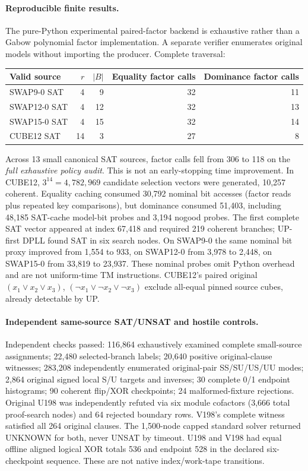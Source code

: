 \documentclass[10pt]{article}
\begin{document}
\paragraph{Reproducible finite results.}
The pure-Python experimental paired-factor backend is exhaustive rather than a Gabow polynomial factor implementation. A separate verifier enumerates original models without importing the producer. Complete traversal:
\begin{center}\begin{tabular}{lrrrr}
\toprule
Valid source & $r$ & $|B|$ & Equality factor calls & Dominance factor calls\\\midrule
SWAP9-0 SAT &4&9&32&11\\
SWAP12-0 SAT&4&12&32&13\\
SWAP15-0 SAT&4&15&32&14\\
CUBE12 SAT&14&3&27&8\\\bottomrule
\end{tabular}\end{center}
Across 13 small canonical SAT sources, factor calls fell from 306 to 118 on the \emph{full exhaustive policy audit}. This is not an early-stopping time improvement. In CUBE12, $3^{14}=4,782,969$ candidate selection vectors were generated, 10,257 coherent. Equality caching consumed 30,792 nominal bit accesses (factor reads plus repeated key comparisons), but dominance consumed 51,403, including 48,185 SAT-cache model-bit probes and 3,194 nogood probes. The first complete SAT vector appeared at index 67,418 and required 219 coherent branches; UP-first DPLL found SAT in six search nodes. On SWAP9-0 the same nominal bit proxy improved from 1,554 to 933, on SWAP12-0 from 3,978 to 2,448, on SWAP15-0 from 33,819 to 23,937. These nominal probes omit Python overhead and are not uniform-time TM instructions. CUBE12's paired original $(x_1\vee x_2\vee x_3)$, $(\neg x_1\vee\neg x_2\vee\neg x_3)$ exclude all-equal pinned source cubes, already detectable by UP.

\paragraph{Independent same-source SAT/UNSAT and hostile controls.}
Independent checks passed: 116,864 exhaustively examined complete small-source assignments; 22,480 selected-branch labels; 20,640 positive original-clause witnesses; 283,208 independently enumerated original-pair SS/SU/US/UU modes; 2,864 original signed local S/U targets and inverses; 30 complete 0/1 endpoint histograms; 90 coherent flip/XOR checkpoints; 24 malformed-fixture rejections. Original U198 was independently refuted via six module cofactors (3,666 total proof-search nodes) and 64 rejected boundary rows. V198's complete witness satisfied all 264 original clauses. The 1,500-node capped standard solver returned UNKNOWN for both, never UNSAT by timeout. U198 and V198 had equal offline aligned logical XOR totals 536 and endpoint 528 in the declared six-checkpoint sequence. These are not native index/work-tape transitions.
\end{document}
